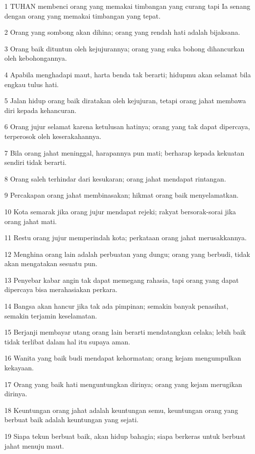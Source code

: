 \par 1 TUHAN membenci orang yang memakai timbangan yang curang tapi Ia senang dengan orang yang memakai timbangan yang tepat.
\par 2 Orang yang sombong akan dihina; orang yang rendah hati adalah bijaksana.
\par 3 Orang baik dituntun oleh kejujurannya; orang yang suka bohong dihancurkan oleh kebohongannya.
\par 4 Apabila menghadapi maut, harta benda tak berarti; hidupmu akan selamat bila engkau tulus hati.
\par 5 Jalan hidup orang baik diratakan oleh kejujuran, tetapi orang jahat membawa diri kepada kehancuran.
\par 6 Orang jujur selamat karena ketulusan hatinya; orang yang tak dapat dipercaya, terperosok oleh keserakahannya.
\par 7 Bila orang jahat meninggal, harapannya pun mati; berharap kepada kekuatan sendiri tidak berarti.
\par 8 Orang saleh terhindar dari kesukaran; orang jahat mendapat rintangan.
\par 9 Percakapan orang jahat membinasakan; hikmat orang baik menyelamatkan.
\par 10 Kota semarak jika orang jujur mendapat rejeki; rakyat bersorak-sorai jika orang jahat mati.
\par 11 Restu orang jujur memperindah kota; perkataan orang jahat merusakkannya.
\par 12 Menghina orang lain adalah perbuatan yang dungu; orang yang berbudi, tidak akan mengatakan sesuatu pun.
\par 13 Penyebar kabar angin tak dapat memegang rahasia, tapi orang yang dapat dipercaya bisa merahasiakan perkara.
\par 14 Bangsa akan hancur jika tak ada pimpinan; semakin banyak penasihat, semakin terjamin keselamatan.
\par 15 Berjanji membayar utang orang lain berarti mendatangkan celaka; lebih baik tidak terlibat dalam hal itu supaya aman.
\par 16 Wanita yang baik budi mendapat kehormatan; orang kejam mengumpulkan kekayaan.
\par 17 Orang yang baik hati menguntungkan dirinya; orang yang kejam merugikan dirinya.
\par 18 Keuntungan orang jahat adalah keuntungan semu, keuntungan orang yang berbuat baik adalah keuntungan yang sejati.
\par 19 Siapa tekun berbuat baik, akan hidup bahagia; siapa berkeras untuk berbuat jahat menuju maut.
